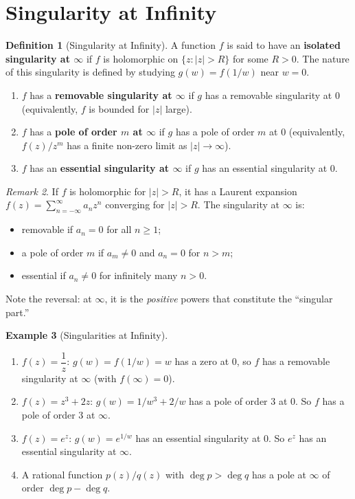 \documentclass[12pt,a4paper,openany]{book}
\theoremstyle{definition}
\newtheorem{definition}{Definition}[chapter]
\newtheorem{example}[definition]{Example}
\theoremstyle{plain}
\theoremstyle{remark}
\newtheorem{remark}[definition]{Remark}
\newcommand{\abs}[1]{\left|#1\right|}
\begin{document}
\section{Singularity at Infinity}
\label{sec:singularity-infinity}

\begin{definition}[Singularity at Infinity]\label{def:singularity-infinity}
A function $f$ is said to have an \textbf{isolated singularity at $\infty$} if
$f$ is holomorphic on $\{z:\abs{z}>R\}$ for some $R>0$. The nature of this
singularity is defined by studying $g(w)=f(1/w)$ near $w=0$.
\begin{enumerate}[label=(\roman*)]
  \item $f$ has a \textbf{removable singularity at $\infty$} if $g$ has a
    removable singularity at $0$ (equivalently, $f$ is bounded for $\abs{z}$
    large).
  \item $f$ has a \textbf{pole of order $m$ at $\infty$} if $g$ has a pole of
    order $m$ at $0$ (equivalently, $f(z)/z^m$ has a finite non-zero limit as
    $\abs{z}\to\infty$).
  \item $f$ has an \textbf{essential singularity at $\infty$} if $g$ has an
    essential singularity at $0$.
\end{enumerate}
\end{definition}

\begin{remark}\label{rem:infinity-laurent}
If $f$ is holomorphic for $\abs{z}>R$, it has a Laurent expansion
$f(z)=\sum_{n=-\infty}^{\infty}a_n z^n$ converging for $\abs{z}>R$. The
singularity at $\infty$ is:
\begin{itemize}
  \item removable if $a_n=0$ for all $n\ge 1$;
  \item a pole of order $m$ if $a_m\ne 0$ and $a_n=0$ for $n>m$;
  \item essential if $a_n\ne 0$ for infinitely many $n>0$.
\end{itemize}
Note the reversal: at $\infty$, it is the \emph{positive} powers that constitute
the ``singular part.''
\end{remark}

\begin{example}[Singularities at Infinity]\label{ex:singularity-infinity}
\begin{enumerate}[label=(\alph*)]
  \item $f(z)=\dfrac{1}{z}$: $g(w)=f(1/w)=w$ has a zero at $0$, so $f$ has a
    removable singularity at $\infty$ (with $f(\infty)=0$).
  \item $f(z)=z^3+2z$: $g(w)=1/w^3+2/w$ has a pole of order 3 at $0$. So $f$
    has a pole of order 3 at $\infty$.
  \item $f(z)=e^z$: $g(w)=e^{1/w}$ has an essential singularity at $0$. So
    $e^z$ has an essential singularity at $\infty$.
  \item A rational function $p(z)/q(z)$ with $\deg p > \deg q$ has a pole at
    $\infty$ of order $\deg p - \deg q$.
\end{enumerate}
\end{example}
\end{document}
